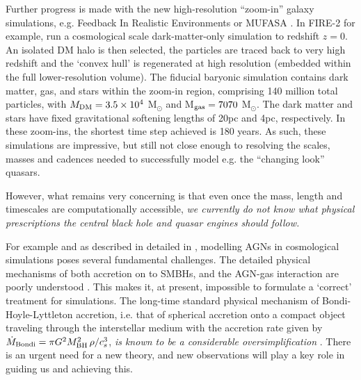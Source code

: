 \smallskip 
\smallskip
\noindent 
Further progress is made with the new high-resolution ``zoom-in''
galaxy simulations, e.g. Feedback In Realistic Environments
\citep[FIRE-2;][]{Wetzel2016, Hopkins2017} or MUFASA
\citep[][]{Dave2016}.  In FIRE-2 for example, \citet{Wetzel2016} run a
cosmological scale dark-matter-only simulation to redshift $z=0$. An
isolated DM halo is then selected, the particles are traced back to
very high redshift and the `convex hull' is regenerated at high
resolution (embedded within the full lower-resolution volume).  The
fiducial baryonic simulation contains dark matter, gas, and stars
within the zoom-in region, comprising 140 million total particles,
with $M_{\rm DM} =3.5\times10^{4}$ M$_{\odot}$ and M$_{\rm gas} =
7070$ M$_{\odot}$.  The dark matter and stars have fixed gravitational
softening lengths of 20pc and 4pc, respectively.  In these zoom-ins,
the shortest time step achieved is 180 years.  As such, these
simulations are impressive, but still not close enough to resolving
the scales, masses and cadences needed to successfully model e.g. the
``changing look'' quasars.

\smallskip 
\smallskip
\noindent 
However, what remains very concerning is that even once the mass,
length and timescales are computationally accessible, {\it we
currently do not know what physical prescriptions the central black
hole and quasar engines should follow.}

\smallskip
\smallskip
\noindent
For example and as described in detailed in \citet{Weinberger2017},
modelling AGNs in cosmological simulations poses several fundamental
challenges. The detailed physical mechanisms of both accretion on to
SMBHs, and the AGN-gas interaction are poorly understood
\citep{Hopkins_Quataert2010, Hopkins_Quataert2011,
Huarte-Espinosa2011, Gaibler2012, Angles-Alcazar2013, Gaspari2013,
Cielo2014, Costa2014, Angles-Alcazar2015, Emsellem2015,
CurtisSijacki2015, CurtisSijacki2016a, CurtisSijacki2016b,
Rosas-Guevara2015, Roos2015, Hopkins2016, Bieri2017,
Angles-Alcazar2017}. This makes it, at present, impossible to formulate
a `correct' treatment for simulations.  The long-time standard
physical mechanism of Bondi-Hoyle-Lyttleton accretion, i.e. that of
spherical accretion onto a compact object traveling through the
interstellar medium \citep{Hoyle_Lyttleton1939, Bondi_Hoyle1944,
Bondi1952} with the accretion rate given by $\dot {M}_{\rm Bondi} =
\pi G^{2 }M_{\rm BH}^{2} \, \rho / c_{s}^{3}$, {\it is known to
be a considerable oversimplification} \citep[e.g.,][]{Edgar2004}.
There is an urgent need for a new theory, and new observations will 
play a key role in guiding us and achieving this.



